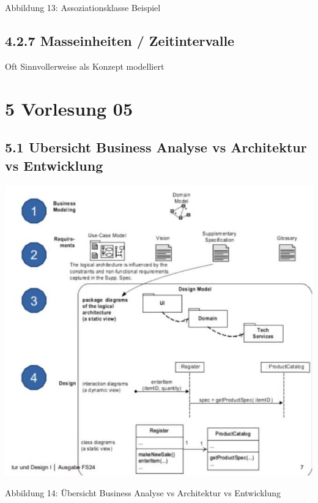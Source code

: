 \documentclass[10pt]{article}
\begin{document}
Abbildung 13: Assoziationsklasse Beispiel

\subsection*{4.2.7 Masseinheiten / Zeitintervalle}
Oft Sinnvollerweise als Konzept modelliert

\section*{5 Vorlesung 05}
\subsection*{5.1 Ubersicht Business Analyse vs Architektur vs Entwicklung}
\begin{center}
\includegraphics[width=\linewidth]{images/2024_12_29_0d1d7b5551ea1b4b41bdg-07(2)}
\end{center}

Abbildung 14: Übersicht Business Analyse vs Architektur vs Entwicklung
\end{document}
